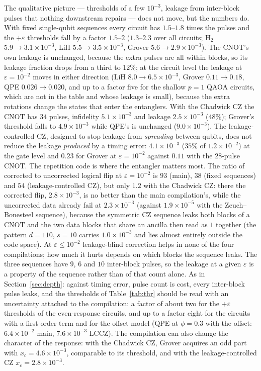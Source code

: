 \documentclass[reprint,aps,pra,amsmath,amssymb,superscriptaddress,letterpaper]{revtex4-2}
\newcommand{\Hz}{\mathrm{H}_2}
\begin{document}
The qualitative picture --- thresholds of a few $10^{-3}$, leakage from inter-block pulses that nothing downstream repairs --- does not move, but the numbers do. With fixed single-qubit sequences every circuit has $1.5$--$1.8$ times the pulses and the $+\varepsilon$ thresholds fall by a factor $1.5$--$2$ ($1.3$--$2.3$ over all circuits; $\Hz$ $5.9\to3.1\times10^{-3}$, LiH $5.5\to3.5\times10^{-3}$, Grover $5.6\to2.9\times10^{-3}$). The CNOT's own leakage is unchanged, because the extra pulses are all within blocks, so its leakage fraction drops from a third to $12\%$; at the circuit level the leakage at $\varepsilon=10^{-2}$ moves in either direction (LiH $8.0\to6.5\times10^{-3}$, Grover $0.11\to0.18$, QPE $0.026\to0.020$, and up to a factor five for the shallow $p=1$ QAOA circuits, which are not in the table and whose leakage is small), because the extra rotations change the states that enter the entanglers. With the Chadwick
CZ the CNOT has $34$ pulses, infidelity $5.1\times10^{-3}$ and leakage
$2.5\times10^{-3}$ ($48\%$); Grover's threshold falls to $4.9\times10^{-3}$
while QPE's is unchanged ($9.0\times10^{-3}$). The leakage-controlled CZ, designed to stop leakage from \emph{spreading} between qubits, does not reduce the leakage \emph{produced} by a timing error: $4.1\times10^{-3}$ ($35\%$ of $1.2\times10^{-2}$) at the gate level and $0.23$ for Grover at $\varepsilon=10^{-2}$ against $0.11$ with the 28-pulse CNOT. The repetition code is where the entangler matters most. The ratio of corrected to uncorrected logical flip at $\varepsilon=10^{-2}$ is $93$ (main), $38$ (fixed sequences) and $54$ (leakage-controlled CZ), but only $1.2$ with the Chadwick CZ: there the corrected flip, $2.8\times10^{-3}$, is no better than the main compilation's, while the uncorrected data already fail at $2.3\times10^{-3}$ (against $1.9\times10^{-5}$ with the Zeuch--Bonesteel sequence), because the symmetric CZ sequence leaks both blocks of a CNOT and the two data blocks that share an ancilla then read as $1$ together (the pattern $d=110$, $s=10$ carries $1.0\times10^{-3}$ and lies almost entirely outside the code space). At $\varepsilon\le10^{-2}$ leakage-blind correction helps in none of the four compilations; how much it hurts depends on which blocks the sequence leaks. The three sequences have $9$, $6$ and $10$ inter-block pulses, so the leakage at a given $\varepsilon$ is a property of the sequence rather than of that count alone. As in Section~\ref{sec:depth}: against timing error, pulse count is cost, every inter-block pulse leaks, and the thresholds of Table~\ref{tab:thr} should be read with an uncertainty attached to the compilation: a factor of about two for the $+\varepsilon$ thresholds of the even-response circuits, and up to a factor eight for the circuits with a first-order term and for the offset model (QPE at $\phi=0.3$ with the offset: $6.4\times10^{-2}$ main, $7.6\times10^{-3}$ LCCZ). The compilation can also change the character of the response: with the Chadwick CZ, Grover acquires an odd part with $x_c=4.6\times10^{-3}$, comparable to its threshold, and with the leakage-controlled CZ $x_c=2.8\times10^{-3}$.
\end{document}
